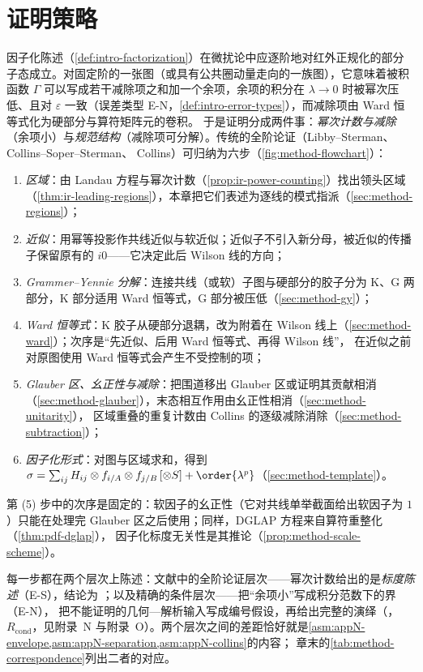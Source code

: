\section{证明策略}\label{sec:method-strategy}

因子化陈述（\cref{def:intro-factorization}）在微扰论中应逐阶地对红外正规化的部分子态成立。对固定阶的一张图（或具有公共圈动量走向的一族图），它意味着被积函数 $\Gamma$
可以写成若干减除项之和加一个余项，余项的积分在 $\lambda\to0$ 时被幂次压低、且对 $\varepsilon$ 一致（误差类型 E-N，\cref{def:intro-error-types}），而减除项由 Ward 恒等式化为硬部分与算符矩阵元的卷积。
于是证明分成两件事：\emph{幂次计数与减除}（余项小）与\emph{规范结构}（减除项可分解）。传统的全阶论证（Libby--Sterman\cite{LibbySterman1978a}、Collins--Soper--Sterman\cite{CollinsSoperSterman1989}、
Collins\cite{Collins2011}）可归纳为六步（\cref{fig:method-flowchart}）：
\begin{enumerate}[label=(\arabic*),leftmargin=2.2em,itemsep=0pt,topsep=2pt]
\item \emph{区域}：由 Landau 方程与幂次计数（\cref{prop:ir-power-counting}）找出领头区域（\cref{thm:ir-leading-regions}），本章把它们表述为逐线的模式指派（\cref{sec:method-regions}）；
\item \emph{近似}：用幂等投影作共线近似与软近似；近似子不引入新分母，被近似的传播子保留原有的 $i0$——它决定此后 Wilson 线的方向；
\item \emph{Grammer--Yennie 分解}：连接共线（或软）子图与硬部分的胶子分为 K、G 两部分，K 部分适用 Ward 恒等式，G 部分被压低（\cref{sec:method-gy}）；
\item \emph{Ward 恒等式}：K 胶子从硬部分退耦，改为附着在 Wilson 线上（\cref{sec:method-ward}）；次序是“先近似、后用 Ward 恒等式、再得 Wilson 线”，
  在近似之前对原图使用 Ward 恒等式会产生不受控制的项\cite{CollinsSoperSterman1989,Labastida:1984gy}；
\item \emph{Glauber 区、幺正性与减除}：把围道移出 Glauber 区或证明其贡献相消（\cref{sec:method-glauber}），末态相互作用由幺正性相消（\cref{sec:method-unitarity}），
  区域重叠的重复计数由 Collins 的逐级减除消除（\cref{sec:method-subtraction}）；
\item \emph{因子化形式}：对图与区域求和，得到 $\sigma=\sum_{ij}H_{ij}\otimes f_{i/A}\otimes f_{j/B}\,[\otimes S]+\order{\lambda^p}$（\cref{sec:method-template}）。
\end{enumerate}
第 (5) 步中的次序是固定的：软因子的幺正性（它对共线单举截面给出软因子为 $1$）只能在处理完 Glauber 区之后使用；同样，DGLAP 方程来自算符重整化（\cref{thm:pdf-dglap}），
因子化标度无关性是其推论（\cref{prop:method-scale-scheme}）。

每一步都在两个层次上陈述：文献中的全阶论证层次——幂次计数给出的是\emph{标度陈述}（E-S），结论为 \tagA；以及精确的条件层次——把“余项小”写成积分范数下的界（E-N），
把不能证明的几何—解析输入写成编号假设，再给出完整的演绎（\tagR，$R_{\mathrm{cond}}$，见附录~N 与附录~O）。两个层次之间的差距恰好就是\cref{asm:appN-envelope,asm:appN-separation,asm:appN-collins}的内容；
章末的\cref{tab:method-correspondence}列出二者的对应。

